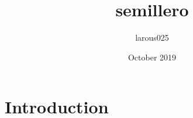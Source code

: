 \documentclass{article}
\title{semillero}
\author{larous025 }
\date{October 2019}
\begin{document}
\maketitle

\section{Introduction}
\end{document}
